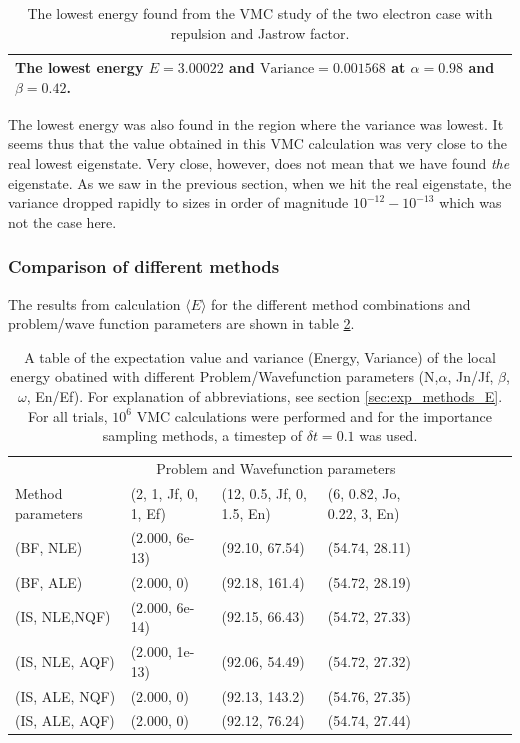 \begin{table}[h!]
		\centering 
	\begin{tabular}{l}
		\toprule
		The lowest energy $E=3.00022$ and $\textrm{Variance} = 0.001568$ at $\alpha = 0.98$ and $\beta = 0.42$. \\
		\bottomrule
	\end{tabular}
	\caption{The lowest energy found from the VMC study of the two electron case with repulsion and Jastrow factor.}
	\label{tab:N2_rep}
\end{table}

The lowest energy was also found in the region where the variance was lowest. 
It seems thus that the value obtained in this VMC calculation was very close to the real lowest eigenstate. 
Very close, however, does not mean that we have found \textit{the} eigenstate. 
As we saw in the previous section, when we hit the real eigenstate, the variance dropped rapidly to sizes in order of magnitude $10^{-12}-10^{-13}$ which was not the case here. 



\subsubsection{Comparison of different methods}

The results from calculation $\langle E \rangle$ for the different method combinations and problem/wave function parameters are shown in table \ref{tab:methods_E}.

\begin{table}[h!]
	\centering
	\begin{tabular}{l @{ } l @{ } l @{ } l @{ } l @{ } l @{ } l  @{ } l  @{ } l  @{ } l }
	\toprule
	  & \multicolumn{3}{c}{Problem and Wavefunction parameters} \\
	 Method parameters $~~~~$ & (2, 1, Jf, 0, 1, Ef) $~$ & (12, 0.5, Jf, 0, 1.5, En) $~$ & (6, 0.82, Jo, 0.22, 3, En)  \\
	\midrule
	(BF, NLE) & 				(2.000, 6e-13)		&		(92.10, 67.54)		&		(54.74, 28.11)			\\
	\shaderow (BF, ALE)	 &		(2.000, 0)			&		(92.18, 161.4)		&		(54.72, 28.19)		\\
	(IS, NLE,NQF) & 			(2.000, 6e-14)		&		(92.15, 66.43)		&		(54.72, 27.33)				 \\
	\shaderow(IS, NLE, AQF) &	(2.000, 1e-13) 		&		(92.06, 54.49)		&		(54.72, 27.32)						\\
	(IS, ALE, NQF) &			(2.000, 0)			&		(92.13, 143.2)		&		(54.76, 27.35)					\\
	\shaderow (IS, ALE, AQF) &	(2.000, 0) 			&		(92.12, 76.24)		&		(54.74, 27.44)	 				\\
	\bottomrule
	\end{tabular}
	\caption{A table of the expectation value and variance (Energy, Variance) of the local energy obatined with different Problem/Wavefunction parameters (N,$\alpha$, Jn/Jf, $\beta$, $\omega$, En/Ef). For explanation of abbreviations, see section \ref{sec:exp_methods_E}.
	For all trials, $10^6$ VMC calculations were performed and for the importance sampling methods, a timestep of $\delta t = 0.1$ was used.}
	\label{tab:methods_E}
\end{table}


